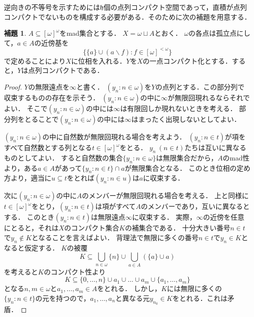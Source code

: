 \documentclass[uplatex,dvipdfmx]{jsarticle}
\newcommand{\h}{\mathfrak{h}}
\renewcommand\subset{\subseteq}
\renewcommand{\setminus}{\smallsetminus}
\theoremstyle{definition}
\newtheorem{lem}[thm]{補題}
\theoremstyle{named}
\begin{document}
逆向きの不等号を示すためには$\h$個の点列コンパクト空間であって，直積が点列コンパクトでないものを構成する必要がある．そのために次の補題を用意する．

\begin{lem}\label{cptn}
$A \subset [\omega]^\omega$をmad集合とする．
$X = \omega \sqcup A$とおく．
$\omega$の各点は孤立点にして，$a \in A$の近傍基を
\[
\{ \{a\} \cup (a \setminus f) : f \in [\omega]^{<\omega} \}
\]
で定めることにより$X$に位相を入れる．$Y$を$X$の一点コンパクト化とする．すると，$Y$は点列コンパクトである．
\end{lem}
\begin{proof}
$Y$の無限遠点を$\infty$と書く．
$(y_n : n \in \omega)$を$Y$の点列とする．この部分列で収束するものの存在を示そう．
$(y_n : n \in \omega)$の中に$\infty$が無限回現れるならそれでよい．
そこで$(y_n : n \in \omega)$の中には$\infty$は有限回しか現れないときを考える．
部分列をとることで$(y_n : n \in \omega)$の中には$\infty$はまったく出現しないとしてよい．

$(y_n : n \in \omega)$の中に自然数が無限回現れる場合を考えよう．
$(y_n : n \in t)$が項をすべて自然数とする列となる$t \in [\omega]^\omega$をとる．
$y_n\ (n \in t)$たちは互いに異なるものとしてよい．
すると自然数の集合$\{y_n : n \in \omega\}$は無限集合だから，$A$のmad性より，ある$a \in A$があって$\{y_n : n \in t\} \cap a$が無限集合となる．
このとき位相の定め方より，適当に$u \subset t$をとれば$(y_n : n \in u)$は$a$に収束する．

次に$(y_n : n \in \omega)$の中に$A$のメンバーが無限回現れる場合を考える．
上と同様に$t \in [\omega]^\omega$をとり，$(y_n : n \in t)$は項がすべて$A$のメンバーであり，互いに異なるとする．
このとき$(y_n : n \in t)$は無限遠点$\infty$に収束する．
実際，$\infty$の近傍を任意にとると，それは$X$のコンパクト集合$K$の補集合である．
十分大きい番号$n \in t$で$y_n \not \in K$となることを言えばよい．
背理法で無限に多くの番号$n\in t$で$y_n \in K$となると仮定する．
$K$の被覆
\[K \subseteq \bigcup_{n \in \omega} \{n\} \cup \bigcup_{a \in A} (\{a\} \cup a)\]
を考えると$K$のコンパクト性より
\[
K \subseteq \{0, \dots, n\} \cup a_1 \cup \dots \cup a_m \cup \{a_1, \dots, a_m\}
\]
となる$n, m\in \omega$と$a_1, \dots, a_m \in A$をとれる．
しかし，$K$には無限に多くの$\{y_n : n \in t\}$の元を持つので，$a_1, \dots, a_n$と異なる元$y_{n_0} \in K$をとれる．これは矛盾．
\end{proof}
\end{document}
